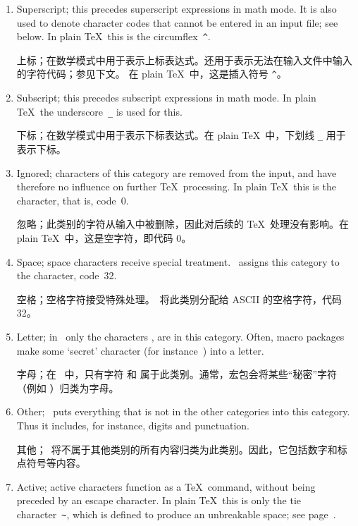 \begin{enumerate}
      参数字符；用于指示宏的参数。在 plain \TeX\ 中，这是井号 \verb-#-。%
\item Superscript; this precedes superscript expressions 
      in math mode. It is also used to denote character
      codes that cannot
      be entered in an input file; see below. 
      In plain \TeX\ this is the circumflex~\verb-^-.

上标；在数学模式中用于表示上标表达式。还用于表示无法在输入文件中输入的字符代码；参见下文。
在 plain \TeX\ 中，这是插入符号 \verb-^-。%
\item Subscript; this precedes subscript expressions in math mode.
      In plain \TeX\ the underscore~\verb-_- is used for this.

      下标；在数学模式中用于表示下标表达式。在 plain \TeX\ 中，下划线 \verb-_- 用于表示下标。%
\item Ignored; characters of this category are removed
      from the input, and have therefore no influence on
      further \TeX\ processing. In plain \TeX\ this is
      the  character, that is, code~0.

      忽略；此类别的字符从输入中被删除，因此对后续的 \TeX\ 处理没有影响。在 plain \TeX\ 中，这是空字符，即代码 0。%
\item\label{ini:sp} Space; space characters receive special treatment.
      \IniTeX\ assigns this category to the \ascii{} 
      character, code~32.

      空格；空格字符接受特殊处理。\IniTeX\ 将此类别分配给 ASCII 的空格字符，代码 32。%
\item\label{ini:let} Letter; in \IniTeX\ only the characters , 
      are in this category. Often, macro packages make
      some `secret' character (for instance~\n@) into a letter.

      字母；在 \IniTeX\ 中，只有字符  和  属于此类别。通常，宏包会将某些“秘密”字符（例如 \n@）归类为字母。%
\item\label{ini:other} Other; \IniTeX\ puts everything that is 
      not in the other categories into this category. Thus
      it includes, for instance, digits and punctuation.

      其他；\IniTeX\ 将不属于其他类别的所有内容归类为此类别。因此，它包括数字和标点符号等内容。%
\item Active; active characters function as a \TeX\ command,
      without being preceded by an escape character.
      In plain \TeX\ this is only the tie character~\verb-~-,
      which is defined to produce
      an unbreakable space; see page~\pageref{tie}.


\end{enumerate}
